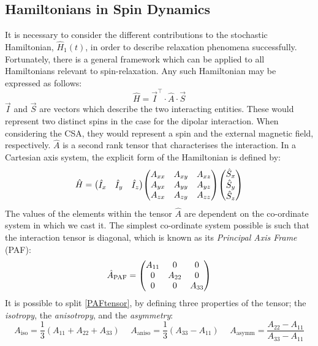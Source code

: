 \subsection{Hamiltonians in Spin Dynamics}
It is necessary to consider the different contributions to the stochastic Hamiltonian, $\hat{H}_1 (t)$, in order to describe relaxation phenomena successfully. Fortunately, there is a general framework which can be applied to all Hamiltonians relevant to spin-relaxation. Any such Hamiltonian may be expressed as follows:
\begin{equation}
\hat{H}=\vec{I}^\intercal \cdot \hat{A} \cdot \vec{S}
\end{equation}
$\vec{I}$ and $\vec{S}$ are vectors which describe the two interacting entities. These would represent two distinct spins in the case for the dipolar interaction. When considering the CSA, they would represent a spin and the external magnetic field, respectively. $\hat{A}$ is a second rank tensor that characterises the interaction. In a Cartesian axis system, the explicit form of the Hamiltonian is defined by:
\begin{equation}
\hat{H} = \mqty(\hat{I}_x & \hat{I}_y & \hat{I}_z) \mqty(A_{xx} & A_{xy} & A_{xz} \\ A_{yx} & A_{yy} & A_{yz} \\ A_{zx} & A_{zy} & A_{zz}) \mqty(\hat{S}_x \\ \hat{S}_y \\ \hat{S}_z)
\end{equation}
The values of the elements within the tensor $\hat{A}$ are dependent on the co-ordinate system in which we cast it. The simplest co-ordinate system possible is such that the interaction tensor is diagonal, which is known as its \textit{Principal Axis Frame} (PAF):
\begin{equation}
\label{PAFtensor}
\hat{A}_{\text{PAF}} = \mqty(A_{11} & 0 & 0 \\ 0 & A_{22} & 0 \\ 0 & 0 & A_{33})
\end{equation}
It is possible to split \ref{PAFtensor}, by defining three properties of the tensor; the \textit{isotropy}, the \textit{anisotropy}, and the \textit{asymmetry}:
\begin{equation}
\label{IsoAnisoAsymm}
A_{\text{iso}} = \frac{1}{3} (A_{11} + A_{22} + A_{33}) \hspace{15pt} A_{\text{aniso}} = \frac{1}{3} (A_{33} - A_{11}) \hspace{15pt} A_{\text{asymm}} = \frac{A_{22} - A_{11}}{A_{33} - A_{11}}
\end{equation}
